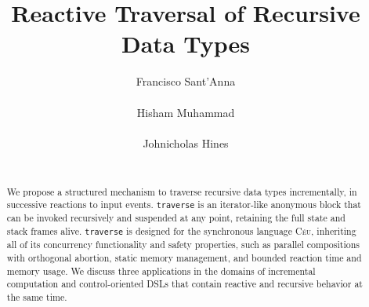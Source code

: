 \documentclass{sig-alternate}
\newcommand{\CEU}{\textsc{C\'{e}u}\xspace}
\newcommand{\code}[1] {{\small{\texttt{#1}}}}
\begin{document}
\title{Reactive Traversal of Recursive Data Types}

\author{
\alignauthor
Francisco Sant'Anna \\
     \\
\alignauthor
Hisham Muhammad \\
     \\
\alignauthor
Johnicholas Hines \\
     \\
}

\maketitle
\begin{abstract}
We propose a structured mechanism to traverse recursive data types 
incrementally, in successive reactions to input events.
\code{traverse} is an iterator-like anonymous block that can be invoked 
recursively and suspended at any point, retaining the full state and stack 
frames alive.
\code{traverse} is designed for the synchronous language \CEU, inheriting all 
of its concurrency functionality and safety properties, such as parallel 
compositions with orthogonal abortion, static memory management, and bounded 
reaction time and memory usage.
We discuss three applications in the domains of incremental computation and 
control-oriented DSLs that contain reactive and recursive behavior at the same 
time.

\end{abstract}
\end{document}
